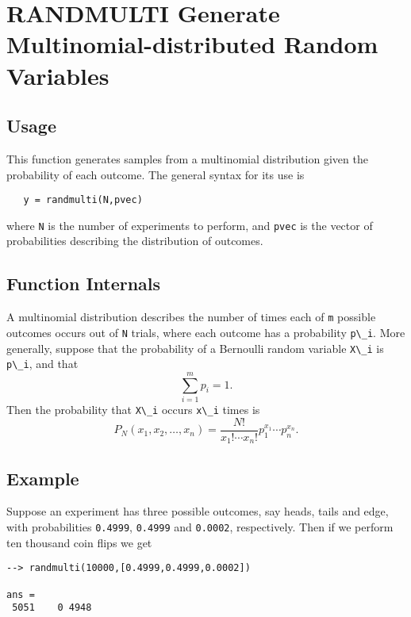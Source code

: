 \section{RANDMULTI Generate Multinomial-distributed Random Variables}

\subsection{Usage}

This function generates samples from a multinomial distribution
given the probability of each outcome.  The general syntax for
its use is
\begin{verbatim}
   y = randmulti(N,pvec)
\end{verbatim}
where \verb|N| is the number of experiments to perform, and \verb|pvec|
is the vector of probabilities describing the distribution of
outcomes.
\subsection{Function Internals}

A multinomial distribution describes the number of times each
of \verb|m| possible outcomes occurs out of \verb|N| trials, where each
outcome has a probability \verb|p\_i|.  More generally, suppose that
the probability of a Bernoulli random variable \verb|X\_i| is \verb|p\_i|,
and that 
\[
   \sum_{i=1}^{m} p_i = 1.
\]
Then the probability that \verb|X\_i| occurs \verb|x\_i| times is
\[
   P_N(x_1,x_2,\ldots,x_n) = \frac{N!}{x_1!\cdots x_n!} p_1^{x_1}\cdots p_n^{x_n}.
\]
\subsection{Example}

Suppose an experiment has three possible outcomes, say heads,
tails and edge, with probabilities \verb|0.4999|, \verb|0.4999| and
\verb|0.0002|, respectively.  Then if we perform ten thousand coin
flips we get
\begin{verbatim}
--> randmulti(10000,[0.4999,0.4999,0.0002])

ans = 
 5051    0 4948 
\end{verbatim}
